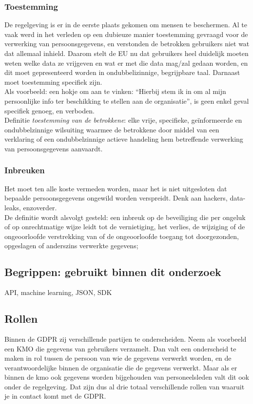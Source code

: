 \subsubsection{Toestemming} 
De regelgeving is er in de eerste plaats gekomen om mensen te beschermen. Al te vaak werd in het verleden op een dubieuze manier toestemming gevraagd voor de verwerking van persoonsgegevens, en verstonden de betrokken gebruikers niet wat dat allemaal inhield. Daarom stelt de EU nu dat gebruikers heel duidelijk moeten weten welke data ze vrijgeven en wat er met die data mag/zal gedaan worden, en dit moet gepresenteerd worden in ondubbelizinnige, begrijpbare taal.
Darnaast moet toestemming specifiek zijn.
\\ Als voorbeeld: een hokje om aan te vinken: “Hierbij stem ik in om al mijn persoonlijke info ter beschikking te stellen aan de organisatie”, is geen enkel geval specifiek genoeg, en verboden.\\ Definitie \textit{toestemming van de betrokkene}: elke vrije, specifieke, geïnformeerde en ondubbelzinnige wilsuiting waarmee de betrokkene door middel van een verklaring of een ondubbelzinnige actieve handeling hem betreffende verwerking van persoonsgegevens aanvaardt. 


\subsubsection{Inbreuken} 
Het moet ten alle koste vermeden worden, maar het is niet uitgesloten dat bepaalde persoonsgegevens ongewild worden verspreidt. Denk aan hackers, data-leaks, enzoverder.
\\ De definitie wordt alsvolgt gesteld: een inbreuk op de beveiliging die per ongeluk of op onrechtmatige wijze leidt tot de vernietiging, het verlies, de wijziging of de ongeoorloofde verstrekking van of de ongeoorloofde toegang tot doorgezonden, opgeslagen of anderszins verwerkte gegevens; 

\subsection{Begrippen: gebruikt binnen dit onderzoek}
API, machine learning, JSON, SDK 

\subsection{Rollen}
Binnen de GDPR zij verschillende partijen te onderscheiden. Neem als voorbeeld een KMO die gegevens van gebruikers verzamelt. Dan valt een onderscheid te maken in rol tussen de persoon van wie de gegevens verwerkt worden, en de verantwoordelijke binnen de organisatie die de gegevens verwerkt. Maar als er binnen de kmo ook gegevens worden bijgehouden van personeelsleden valt dit ook onder de regelgeving. Dat zijn dus al drie totaal verschillende rollen van waaruit je in contact komt met de GDPR. 

